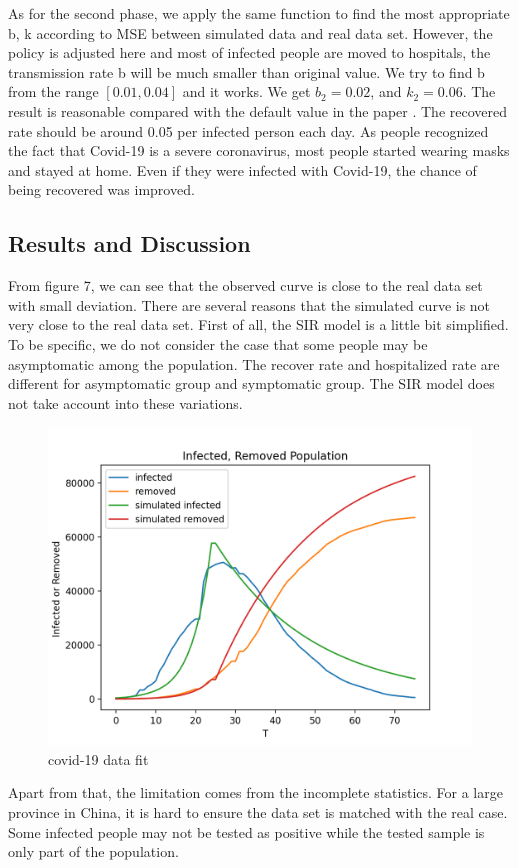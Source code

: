 \documentclass{article}
\begin{document}
As for the second phase, we apply the same function to find the most appropriate b, k according to MSE between simulated data and real data set. However, the policy is adjusted here and most of infected people are moved to hospitals, the transmission rate b will be much smaller than original value. We try to find b from the range $[0.01, 0.04]$ and it works. We get $b_{2}= 0.02$, and $k_{2} = 0.06$. The result is reasonable compared with the default value in the paper \cite{Cooper2020SIR}. The recovered rate should be around 0.05 per infected person each day. As people recognized the fact that Covid-19 is a severe coronavirus, most people started wearing masks and stayed at home. Even if they were infected with Covid-19, the chance of being recovered was improved.





\subsection{Results and Discussion}

From figure 7, we can see that the observed curve is close to the real data set with small deviation. There are several reasons that the simulated curve is not very close to the real data set. First of all, the SIR model is a little bit simplified. To be specific, we do not consider the case that some people may be asymptomatic among the population. The recover rate and hospitalized rate are different for asymptomatic group and symptomatic group. The SIR model does not take account into these variations.


\begin{figure}[htp]
\centering
\includegraphics[width=.3\textwidth]{covidsir4.png}
\caption{covid-19 data fit}
\label{fig:figure6}
\end{figure}



Apart from that, the limitation comes from the incomplete statistics. For a large province in China, it is hard to ensure the data set is matched with the real case. Some infected people may not be tested as positive while the tested sample is only part of the population.
\end{document}

